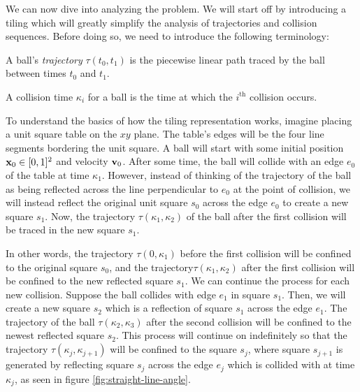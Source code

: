 
We can now dive into analyzing the problem. We will start off by introducing a tiling which will greatly simplify the analysis of trajectories and collision sequences. Before doing so, we need to introduce the following terminology:

\begin{definition}
  A ball's \emph{trajectory} $\tau(t_0, t_1)$ is the piecewise linear path traced by the ball between times $t_0$ and $t_1$.
\end{definition}

\begin{definition}
  A collision time $\kappa_i$ for a ball is the time at which the $i^{\textrm{th}}$ collision occurs.
\end{definition}

To understand the basics of how the tiling representation works, imagine placing a unit square table on the $xy$ plane. The table's edges will be the four line segments bordering the unit square. A ball will start with some initial position $\mathbf{x}_0 \in [0,1]^2$ and velocity $\mathbf{v}_0$. After some time, the ball will collide with an edge $e_0$ of the table at time $\kappa_1$. However, instead of thinking of the trajectory of the ball as being reflected across the line perpendicular to $e_0$ at the point of collision, we will instead reflect the original unit square $s_0$ across the edge $e_0$ to create a new square $s_1$. Now, the trajectory $\tau(\kappa_1, \kappa_2)$ of the ball after the first collision will be traced in the new square $s_1$.

In other words, the trajectory $\tau(0, \kappa_1)$ before the first collision will be confined to the original square $s_0$, and the trajectory$\tau(\kappa_1, \kappa_2)$ after the first collision will be confined to the new reflected square $s_1$. We can continue the process for each new collision. Suppose the ball collides with edge $e_1$ in square $s_1$. Then, we will create a new square $s_2$ which is a reflection of square $s_1$ across the edge $e_1$. The trajectory of the ball $\tau(\kappa_2, \kappa_3)$ after the second collision will be confined to the newest reflected square $s_2$. This process will continue on indefinitely so that the trajectory $\tau(\kappa_j, \kappa_{j+1})$ will be confined to the square $s_j$, where square $s_{j+1}$ is generated by reflecting square $s_{j}$ across the edge $e_{j}$ which is collided with at time $\kappa_j$, as seen in figure \ref{fig:straight-line-angle}.

